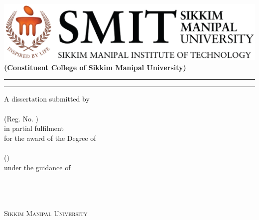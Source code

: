 \begin{titlepage}
\centering
\large 
\vspace*{-2\baselineskip}
\includegraphics[scale=.6]{img/smit-logo}\\[-1.5em]

{\color{orange}\bf (Constituent College of Sikkim Manipal University)}\\[1em]

\rule{\linewidth}{2pt}
{\Huge\textbf{\thesistitle}}
\rule{\linewidth}{4pt}

{A dissertation submitted by\\
	
	{\bf  \studentname}\\
	
	(Reg. No. \regno)\\[\baselineskip]
	
	in partial fulfilment\\
	\baselineskip=18pt for the award of the Degree of \\
	
	{\bf \degree}\\
	
	(\coursename)\\[2\baselineskip]
	
	\baselineskip=18pt 	under the guidance of \\
	\baselineskip=18pt \textbf{\guidename}\\
	\baselineskip=18pt 	\guidedesignation
	
	\vfill

	\textsc{\department}\\
	
	\textsc{\institute}\\
	\textsc{Sikkim Manipal University}
	\submissiondate}
	\vspace{1em}

\end{titlepage}